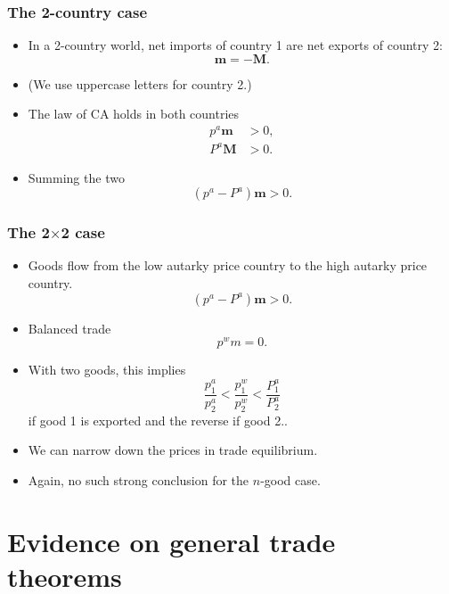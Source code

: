\documentclass[compress,mathserif,aspectratio=169]{beamer}
\newcounter{perc}
\begin{document}
\begin{frame}\frametitle{The 2-country case}\hypertarget{The 2-country case}{}
\begin{itemize}
\item In a 2-country world, net imports of country 1 are net exports of country 2:
\[
\mathbf m = -\mathbf M.
\]

\item (We use uppercase letters for country 2.)

\item The law of CA holds in both countries
\begin{align*}
p^a\mathbf m &>0,\\
P^a\mathbf M &>0.
\end{align*}

\item Summing the two
\[
(p^a-P^a) \mathbf m >0.
\]


\end{itemize}
\end{frame}



\begin{frame}\frametitle{The 2$\times$2 case}\hypertarget{The 2$\times$2 case}{}
\begin{itemize}
\item Goods flow from the low autarky price country to the high autarky price country.
\[
(p^a-P^a) \mathbf m >0.
\]

\item Balanced trade
\[
p^w m = 0.
\]

\item With two goods, this implies
\[
\frac{p^a_1}{p^a_2} < \frac{p^w_1}{p^w_2} < \frac{P^a_1}{P^a_2}
\]
if good 1 is exported and the reverse if good 2..

\item We can narrow down the prices in trade equilibrium.

\item Again, no such strong conclusion for the $n$-good case.






\end{itemize}
\end{frame}







\section{Evidence on general trade theorems}\hypertarget{Evidence on general trade theorems}{}
\end{document}
